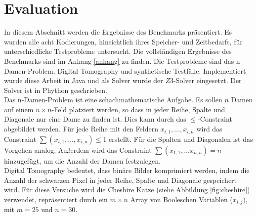 \documentclass[a4,abstract=on]{scrartcl}
\newcommand*\stdsection{}
\let\stdsection\section
\renewcommand*\section{%
    \clearpage\ifodd\value{page}\else\mbox{}\clearpage\fi
    \stdsection}
\begin{document}
\section{Evaluation}
In diesem Abschnitt werden die Ergebnisse des Benchmarks präsentiert. Es wurden alle acht Kodierungen, hinsichtlich ihres Speicher- und Zeitbedarfs, für unterschiedliche Testprobleme untersucht. Die vollständigen Ergebnisse des Benchmarks sind im Anhang \ref{anhang} zu finden. Die Testprobleme sind das n-Damen-Problem, Digital Tomography und synthetische Testfälle. Implementiert wurde diese Arbeit in Java und als Solver wurde der $Z3$-Solver eingesetzt. Der Solver ist in Phython geschrieben.\\
Das n-Damen-Problem ist eine schachmathematische Aufgabe. Es sollen $n$ Damen auf einem $n\times n$-Feld platziert werden, so dass in jeder Reihe, Spalte und Diagonale nur eine Dame zu finden ist. Dies kann durch das $\leq$-Constraint abgebildet werden. Für jede Reihe mit den Feldern $x_{i,1}, \dots, x_{i,n}$ wird das Constraint $\sum (x_{i,1}, \dots, x_{i,n}) \leq 1$ erstellt. Für die Spalten und Diagonalen ist das Vorgehen analog. Außerdem wird das Constraint $\sum (x_{1,1}, \dots x_{n,n})=n$ hinzugefügt, um die Anzahl der Damen festzulegen.\\
Digital Tomography bedeutet, dass binäre Bilder komprimiert werden, indem die Anzahl der schwarzen Pixel in jeder Reihe, Spalte und Diagonale gespeichert wird. Für diese Versuche wird die Cheshire Katze (siehe Abbildung \ref{fig:cheshire}) verwendet, repräsentiert durch ein $m \times n$ Array von Booleschen Variablen ($x_{i,j})$, mit $m=25$ und $n=30$. 
\end{document}
